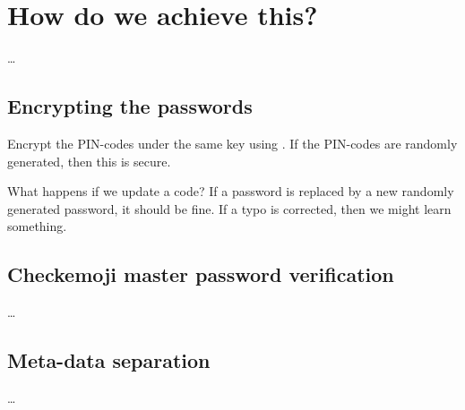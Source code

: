 \section{How do we achieve this?}
\label{Design}

\dots

\subsection{Encrypting the passwords}

Encrypt the PIN-codes under the same key using .
If the PIN-codes are randomly generated, then this is secure.

What happens if we update a code?
If a password is replaced by a new randomly generated password, it should be 
fine.
If a typo is corrected, then we might learn something.

\subsection{Checkemoji master password verification}

\dots

\subsection{Meta-data separation}

\dots

